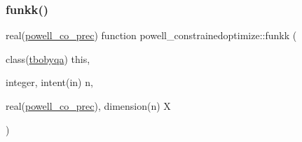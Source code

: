 \subsubsection{\texorpdfstring{funkk()}{funkk()}}
{\footnotesize\ttfamily real(\mbox{\hyperlink{namespacepowell__constrainedoptimize_a18207be3e2f370a42332601cfccca22e}{powell\+\_\+co\+\_\+prec}}) function powell\+\_\+constrainedoptimize\+::funkk (\begin{DoxyParamCaption}\item[{class(\mbox{\hyperlink{structpowell__constrainedoptimize_1_1tbobyqa}{tbobyqa}})}]{this,  }\item[{integer, intent(in)}]{n,  }\item[{real(\mbox{\hyperlink{namespacepowell__constrainedoptimize_a18207be3e2f370a42332601cfccca22e}{powell\+\_\+co\+\_\+prec}}), dimension(n)}]{X }\end{DoxyParamCaption})\hspace{0.3cm}{\ttfamily [private]}}

\mbox{\label{namespacepowell__constrainedoptimize_a8e5256bd13e2e03b0e1dda0e1ff3ef1f}} 
